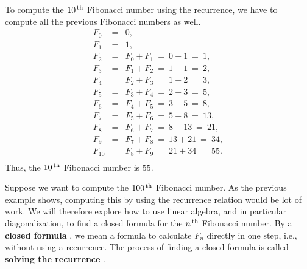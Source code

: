 \begin{solution}
  To compute the $10^{\,\rm th}$ Fibonacci number using the recurrence, we
  have to compute all the previous Fibonacci numbers as well.
  \begin{eqnarray*}
    F_0 &=& 0, \\
    F_1 &=& 1, \\
    F_2 &=& F_0 + F_1 ~=~ 0 + 1 ~=~ 1, \\
    F_3 &=& F_1 + F_2 ~=~ 1 + 1 ~=~ 2, \\
    F_4 &=& F_2 + F_3 ~=~ 1 + 2 ~=~ 3, \\
    F_5 &=& F_3 + F_4 ~=~ 2 + 3 ~=~ 5, \\
    F_6 &=& F_4 + F_5 ~=~ 3 + 5 ~=~ 8, \\
    F_7 &=& F_5 + F_6 ~=~ 5 + 8 ~=~ 13, \\
    F_8 &=& F_6 + F_7 ~=~ 8 + 13 ~=~ 21, \\
    F_9 &=& F_7 + F_8 ~=~ 13 + 21 ~=~ 34, \\
    F_{10} &=& F_8 + F_9 ~=~ 21 + 34 ~=~ 55. \\
  \end{eqnarray*}
  Thus, the $10^{\,\rm th}$ Fibonacci number is $55$.
\end{solution}

Suppose we want to compute the $100^{\,\rm th}$ Fibonacci number. As the
previous example shows, computing this by using the recurrence
relation would be lot of work. We will therefore explore how to use
linear algebra, and in particular diagonalization, to find a closed
formula for the $n^{\,\rm th}$ Fibonacci number. By a \textbf{closed formula}%
%
, we mean a formula to calculate $F_n$ directly
in one step, i.e., without using a recurrence. The process of finding
a closed formula is called \textbf{solving the recurrence}%
.

